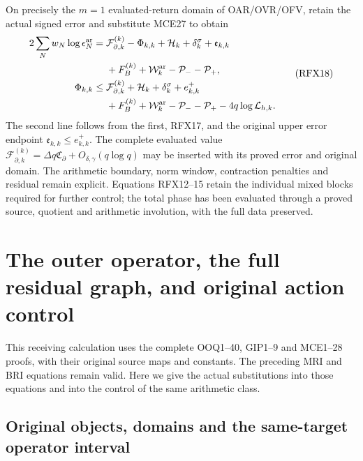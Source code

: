 \documentclass[11pt,a4paper]{article}
\begin{document}
On precisely the $m=1$ evaluated-return domain of OAR/OVR/OFV,
retain the actual signed error and substitute MCE27 to obtain
\[
 \begin{aligned}
 2\sum_Nw_N\log\epsilon_N^{\rm ar}
  ={}&\mathcal F_{\partial,k}^{(k)}-\Phi_{k,k}
       +\mathcal H_k+\delta_k^\sigma+\mathfrak e_{k,k}\\
       &+F_B^{(k)}+\mathcal W_k^{\rm ar}-\mathcal P_--\mathcal P_+,\\
 \Phi_{k,k}\le{}&\mathcal F_{\partial,k}^{(k)}
       +\mathcal H_k+\delta_k^\sigma+e_{k,k}^+\\
       &+F_B^{(k)}+\mathcal W_k^{\rm ar}-\mathcal P_--\mathcal P_+
       -4q\log\mathcal L_{h,k}.
 \end{aligned}\tag{RFX18}
\]
The second line follows from the first, RFX17, and the original
upper error endpoint $\mathfrak e_{k,k}\le e_{k,k}^+$.
The complete evaluated value
$\mathcal F_{\partial,k}^{(k)}=\Delta q\mathfrak C_\partial
+O_{\delta,\gamma}(q\log q)$ may be inserted with its proved
error and original domain. The arithmetic boundary, norm window,
contraction penalties and residual remain explicit. Equations
RFX12--15 retain the individual mixed blocks required for further
control; the total phase has been evaluated through a proved source,
quotient and arithmetic involution, with the full data preserved.


\clearpage
\section{The outer operator, the full residual graph, and original action control}
\label{sec:OMR}

This receiving calculation uses the complete OOQ1--40, GIP1--9 and
MCE1--28 proofs, with their original source maps and constants.
The preceding MRI and BRI equations remain valid. Here we give the
actual substitutions into those equations and into the control of
the same arithmetic class.

\subsection{Original objects, domains and the same-target operator interval}
\end{document}
